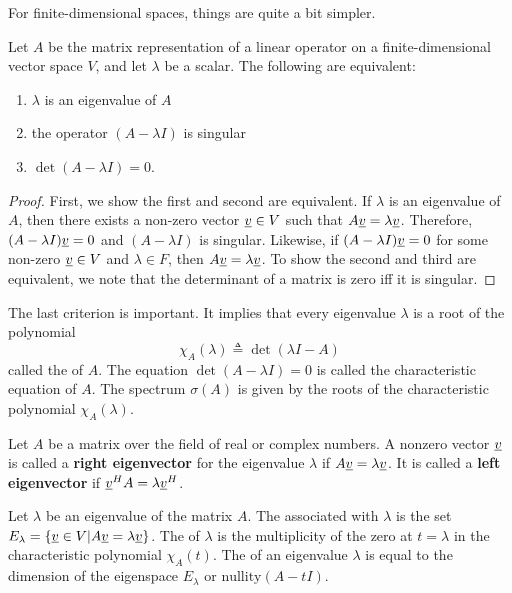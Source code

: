 For finite-dimensional spaces, things are quite a bit simpler.

\begin{theorem}
Let $A$ be the matrix representation of a linear operator on a finite-dimensional vector space $V$, and let $\lambda$ be a scalar.
The following are equivalent:
\begin{enumerate}
\item $\lambda$ is an eigenvalue of $A$
\item the operator $(A - \lambda I)$ is singular
\item $\det (A - \lambda I) = 0$.
\end{enumerate}
\end{theorem}
\begin{proof}
First, we show the first and second are equivalent.
If $\lambda$ is an eigenvalue of $A$, then there exists a non-zero vector $\underline{v} \in V$ such that $A \underline{v} = \lambda \underline{v}$.
Therefore, $(A-\lambda I)\underline{v} = 0$ and $(A - \lambda I)$ is singular.
Likewise, if $(A-\lambda I)\underline{v} = 0$ for some non-zero $\underline{v} \in V$ and $\lambda \in F$, then $A \underline{v} = \lambda \underline{v}$.
To show the second and third are equivalent, we note that the determinant of a matrix is zero iff it is singular.
\end{proof}

The last criterion is important.
It implies that every eigenvalue $\lambda$ is a root of the polynomial 
\[ \chi_A (\lambda) \triangleq \det (\lambda I - A) \]
called the  of $A$.
The equation $\det (A - \lambda I) = 0$ is called the characteristic equation of $A$.
The spectrum $\sigma(A)$ is given by the roots of the characteristic polynomial $\chi_A (\lambda)$.

Let $A$ be a matrix over the field of real or complex numbers.
A nonzero vector $\underline{v}$ is called a \textbf{right eigenvector} for the eigenvalue $\lambda$ if $A \underline{v} = \lambda \underline{v}$.
It is called a \textbf{left eigenvector} if $\underline{v}^H A = \lambda \underline{v}^H$.

\begin{definition}
Let $\lambda$ be an eigenvalue of the matrix $A$.
The  associated with $\lambda$ is the set $E_\lambda = \{ \underline{v} \in V | A \underline{v} = \lambda \underline{v} \}$.
The  of $\lambda$ is the multiplicity of the zero at $t=\lambda$ in the characteristic polynomial $\chi_A (t)$.
The  of an eigenvalue $\lambda$ is equal to the dimension of the eigenspace $E_\lambda$ or $\textrm{nullity}(A - t I)$.
\end{definition}

